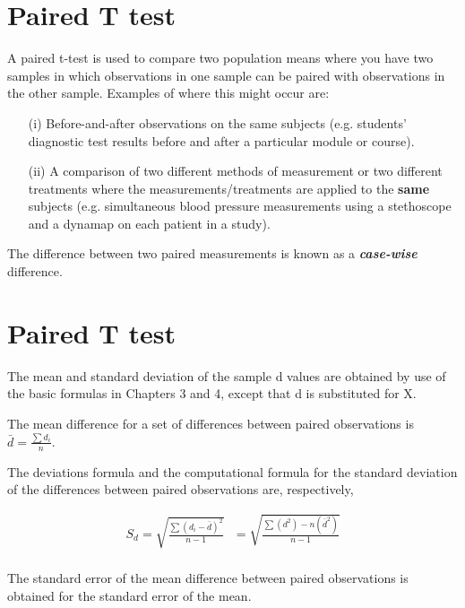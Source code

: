 \documentclass[]{report}
\begin{document}




\section{Paired T test}
A paired t-test is used to compare two population means where you have two samples in
which observations in one sample can be paired with observations in the other sample.
Examples of where this might occur are:
\begin{itemize}
\item[(i)]  Before-and-after observations on the same subjects (e.g. students’ diagnostic test
results before and after a particular module or course).
\item[(ii)] A comparison of two different methods of measurement or two different treatments
where the measurements/treatments are applied to the \textbf{same} subjects (e.g. simultaneous blood
pressure measurements using a stethoscope and a dynamap on each patient in a study).
\end{itemize}
The difference between two paired measurements is known as a \textbf{\emph{case-wise}} difference.





\section{Paired T test}
The mean and standard deviation of the sample d values are
obtained by use of the basic formulas in Chapters 3 and 4, except
that d is substituted for X.

The mean difference for a set of differences between paired
observations is $\bar{d} = \frac{\sum d_{i}}{n}$.

The deviations formula and the computational formula for the
standard deviation of the differences between paired observations
are, respectively,

\begin{eqnarray}
S_{d} = \sqrt{\frac{\sum (d_{i}-\bar{d})^2}{n-1}} \mbox{        }= \sqrt{\frac{ \sum (d^2)- n(\bar{d}^2)}{n-1}}\\
\end{eqnarray}

The standard error of the mean difference between paired
observations is obtained for the standard error of the mean.
\end{document}
